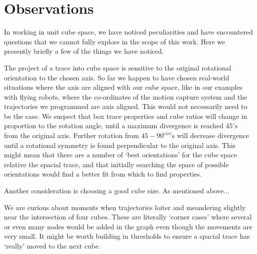\section{Observations}
\label{sec:observations}

In working in unit cube space, we have noticed peculiarities and have encountered questions that we cannot fully explore in the scope of this work.  
Here we presently briefly a few of the things we have noticed.

The project of a trace into cube space is sensitive to the original rotational orientation to the chosen axis.
So far we happen to have chosen real-world situations where the axis are aligned with our cube space, like in our examples with flying robots, where the co-ordinates of the motion capture system and the trajectories we programmed are axis aligned.
This would not necessarily need to be the case.
We suspect that box trace properties and cube ratios will change in proportion to the rotation angle, until a maximum divergence is reached $45^{\circ}$s from the original axis.
Further rotation from $45-90^{circ}$s will decrease divergence until a rotational symmetry is found perpendicular to the original axis.
This might mean that there are a number of `best orientations' for the cube space relative the spacial trace, and that initially searching the space of possible orientations would find a better fit from which to find properties.

Another consideration is choosing a good cube size.  As mentioned above...

We are curious about moments when trajectories loiter and meandering slightly near the intersection of four cubes.
These are literally `corner cases' where several or even many nodes would be added in the graph even though the movements are very small.
It might be worth building in thresholds to ensure a spacial trace has `really' moved to the next cube.



